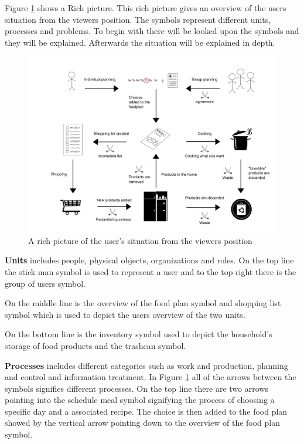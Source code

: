 
Figure \ref{RigtBillede} shows a Rich picture. This rich picture gives an overview of the users situation from the viewers position. The symbols represent different units, processes and problems. To begin with there will be looked upon the symbols and they will be explained. Afterwards the situation will be explained in depth.

  \begin{figure}[H]
	\centering
	\includegraphics[width=1.00\textwidth]{Grafik/FoodPlanner/InkscapeTegninger/RigtBillede.pdf}
	\caption{A rich picture of the user's situation from the viewers position}
	\label{RigtBillede}
\end{figure}
\textbf{Units} includes people, physical objects, organizations and roles. On the top line the stick man symbol is used to represent a user and to the top right there is the group of users symbol. 

On the middle line is the overview of the food plan symbol and shopping list symbol which is used to depict the users overview of the two units. 

On the bottom line is the inventory symbol used to depict the household's storage of food products and the trashcan symbol.    

\textbf{Processes} includes different categories such as work and production, planning and control and information treatment. In Figure \ref{RigtBillede} all of the arrows between the symbols signifies different processes. On the top line there are two arrows pointing into the schedule meal symbol signifying the process of choosing a specific day and a associated recipe. The choice is then added to the food plan showed by the vertical arrow pointing down to the overview of the food plan symbol. 

